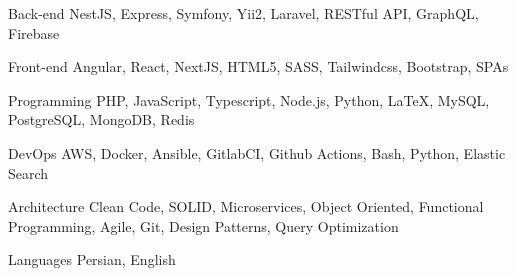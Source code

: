 

\begin{cvskills}

\cvskill
{Back-end} %
{NestJS, Express, Symfony, Yii2, Laravel, RESTful API, GraphQL, Firebase} %

\cvskill
{Front-end} %
{Angular, React, NextJS, HTML5, SASS, Tailwindcss, Bootstrap, SPAs} %

\cvskill
{Programming} %
{PHP, JavaScript, Typescript, Node.js, Python, LaTeX, MySQL, PostgreSQL, MongoDB, Redis} %
    
\cvskill
{DevOps} %
{AWS, Docker, Ansible, GitlabCI, Github Actions, Bash, Python, Elastic Search} %

\cvskill
{Architecture} %
{Clean Code, SOLID, Microservices, Object Oriented, Functional Programming, Agile, Git, Design Patterns, Query Optimization} %

  \cvskill
    {Languages} %
    {Persian, English} %

\end{cvskills}
